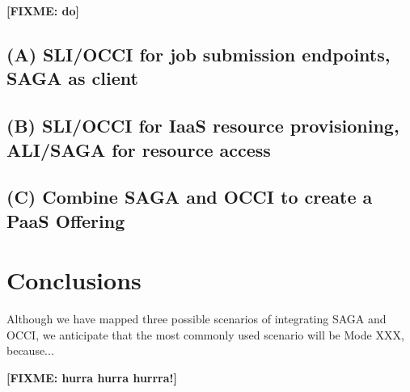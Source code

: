 \documentclass[10pt,conference,final,letterpaper,twoside,twocolumn,]{IEEEtran}
\newcommand{\B}[1]{\textbf{#1}}
\newcommand{\F}[1]{\B{[FIXME: #1]}}
\begin{document}
 \F{do}
 \subsection{(A) SLI/OCCI for job submission endpoints, SAGA as client}
 \subsection{(B) SLI/OCCI for IaaS resource provisioning, ALI/SAGA for
 resource access} 
 \subsection{(C) Combine SAGA and OCCI to create a PaaS Offering}


\section{Conclusions}

Although we have mapped three possible scenarios of integrating SAGA
and OCCI, we anticipate that the most commonly used scenario will be
Mode XXX, because...


\label{sec:conc}

 \F{hurra hurra hurrra!}




\end{document}
